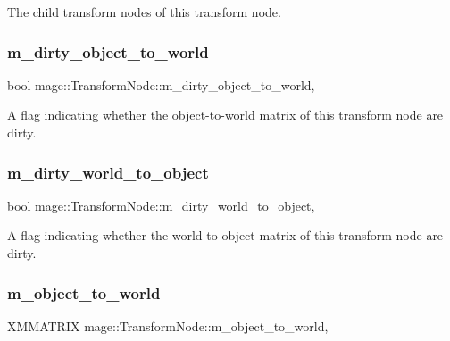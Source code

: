The child transform nodes of this transform node. \hypertarget{classmage_1_1_transform_node_a389151fddc72499d0be4e725622d99b9}{}\label{classmage_1_1_transform_node_a389151fddc72499d0be4e725622d99b9} 
\subsubsection{\texorpdfstring{m\+\_\+dirty\+\_\+object\+\_\+to\+\_\+world}{m\_dirty\_object\_to\_world}}
{\footnotesize\ttfamily bool mage\+::\+Transform\+Node\+::m\+\_\+dirty\+\_\+object\+\_\+to\+\_\+world\hspace{0.3cm}{\ttfamily [mutable]}, {\ttfamily [private]}}

A flag indicating whether the object-\/to-\/world matrix of this transform node are dirty. \hypertarget{classmage_1_1_transform_node_acb9046e0096ada337e1978f016daa144}{}\label{classmage_1_1_transform_node_acb9046e0096ada337e1978f016daa144} 
\subsubsection{\texorpdfstring{m\+\_\+dirty\+\_\+world\+\_\+to\+\_\+object}{m\_dirty\_world\_to\_object}}
{\footnotesize\ttfamily bool mage\+::\+Transform\+Node\+::m\+\_\+dirty\+\_\+world\+\_\+to\+\_\+object\hspace{0.3cm}{\ttfamily [mutable]}, {\ttfamily [private]}}

A flag indicating whether the world-\/to-\/object matrix of this transform node are dirty. \hypertarget{classmage_1_1_transform_node_a79de447d6d40226d7ceb276007f5fbeb}{}\label{classmage_1_1_transform_node_a79de447d6d40226d7ceb276007f5fbeb} 
\subsubsection{\texorpdfstring{m\+\_\+object\+\_\+to\+\_\+world}{m\_object\_to\_world}}
{\footnotesize\ttfamily X\+M\+M\+A\+T\+R\+IX mage\+::\+Transform\+Node\+::m\+\_\+object\+\_\+to\+\_\+world\hspace{0.3cm}{\ttfamily [mutable]}, {\ttfamily [private]}}

